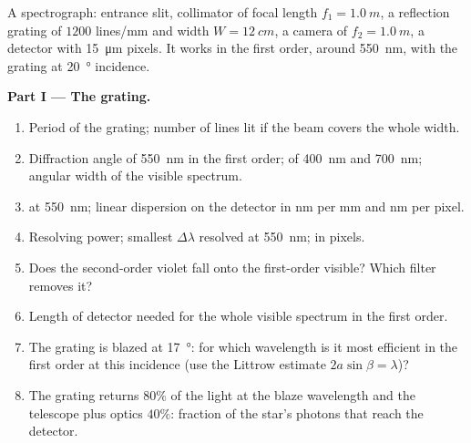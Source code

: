 \begin{problem}
\label{pb:b2:gratings:1}

A spectrograph: entrance slit, collimator of focal length $f_1 =
\qty{1.0}{m}$, a reflection grating of $1200$ lines/mm and width $W =
\qty{12}{cm}$, a camera of $f_2 = \qty{1.0}{m}$, a detector with \qty{15}{\micro m}
pixels. It works in the first order, around \qty{550}{nm}, with the
grating at \qty{20}{\degree} incidence.

\medskip
\noindent\textbf{Part I --- The grating.}
\begin{enumerate}
  \item Period of the grating; number of lines lit if the beam covers
        the whole width.
  \item Diffraction angle of \qty{550}{nm} in the first order; of
        \qty{400}{nm} and \qty{700}{nm}; angular width of the visible
        spectrum.
  \item {} at \qty{550}{nm}; linear dispersion on the
        detector in nm per mm and nm per pixel.
  \item Resolving power; smallest $\Delta\lambda$ resolved at \qty{550}{nm}; in
        pixels.
  \item Does the second-order violet fall onto the first-order
        visible? Which filter removes it?
  \item Length of detector needed for the whole visible spectrum in
        the first order.
  \item The grating is blazed at \qty{17}{\degree}: for which wavelength is
        it most efficient in the first order at this incidence (use
        the Littrow estimate $2a\sin\beta = \lambda$)?
  \item The grating returns $80\%$ of the light at the blaze wavelength
        and the telescope plus optics $40\%$: fraction of the star's
        photons that reach the detector.
\end{enumerate}


\end{problem}
